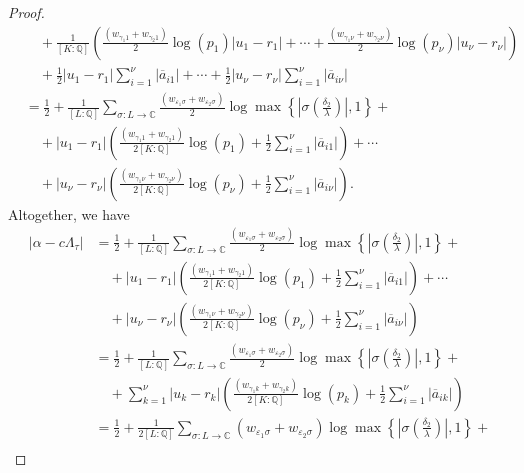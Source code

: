 \begin{proof}
\begin{align*}
	&\quad + \frac{1}{[K:\mathbb{Q}]}\left(\frac{(w_{\gamma_1 1} + w_{\gamma_2 1})}{2}\log(p_1)|u_1 - r_1|+ \cdots + \frac{(w_{\gamma_1 \nu} + w_{\gamma_2 \nu})}{2}\log(p_{\nu})|u_{\nu} - r_{\nu}|\right) \\
	& \quad + \frac{1}{2}|u_1-r_1|\sum_{i=1}^{\nu}|\overline{a}_{i1}| + \cdots + \frac{1}{2}|u_{\nu} - r_{\nu}| \sum_{i=1}^{\nu}|\overline{a}_{i\nu}|\\
	& = \frac{1}{2} + \frac{1}{[L:\mathbb{Q}]}\sum_{\sigma :L \to \mathbb{C}} \frac{(w_{\varepsilon_1 \sigma} + w_{\varepsilon_2 \sigma})}{2}\log \max \left\{ \left|\sigma\left(\frac{\delta_2}{\lambda}\right)\right|, 1\right\} + \\
	& \quad + |u_1 - r_1|\left( \frac{(w_{\gamma_1 1} + w_{\gamma_2 1})}{2[K:\mathbb{Q}]}\log(p_1) + \frac{1}{2}\sum_{i=1}^{\nu}|\overline{a}_{i1}|\right) + \cdots \\
	& \quad + |u_{\nu} - r_{\nu}|\left( \frac{(w_{\gamma_1 {\nu}} + w_{\gamma_2 {\nu}})}{2[K:\mathbb{Q}]}\log(p_{\nu}) + \frac{1}{2}\sum_{i=1}^{\nu}|\overline{a}_{i{\nu}}|\right). 
\end{align*}
Altogether, we have
\begin{align*}
|\alpha-c\Lambda_\tau| 
	& = \frac{1}{2} + \frac{1}{[L:\mathbb{Q}]}\sum_{\sigma :L \to \mathbb{C}} \frac{(w_{\varepsilon_1 \sigma} + w_{\varepsilon_2 \sigma})}{2}\log \max \left\{ \left|\sigma\left(\frac{\delta_2}{\lambda}\right)\right|, 1\right\} + \\
	& \quad + |u_1 - r_1|\left( \frac{(w_{\gamma_1 1} + w_{\gamma_2 1})}{2[K:\mathbb{Q}]}\log(p_1) + \frac{1}{2}\sum_{i=1}^{\nu}|\overline{a}_{i1}|\right) + \cdots \\
	& \quad + |u_{\nu} - r_{\nu}|\left( \frac{(w_{\gamma_1 {\nu}} + w_{\gamma_2 {\nu}})}{2[K:\mathbb{Q}]}\log(p_{\nu}) + \frac{1}{2}\sum_{i=1}^{\nu}|\overline{a}_{i{\nu}}|\right)\\
	& = \frac{1}{2} + \frac{1}{[L:\mathbb{Q}]}\sum_{\sigma :L \to \mathbb{C}} \frac{(w_{\varepsilon_1 \sigma} + w_{\varepsilon_2 \sigma})}{2}\log \max \left\{ \left|\sigma\left(\frac{\delta_2}{\lambda}\right)\right|, 1\right\} + \\
	& \quad + \sum_{k = 1}^{\nu} |u_k - r_k|\left( \frac{(w_{\gamma_1 k} + w_{\gamma_2 k})}{2[K:\mathbb{Q}]}\log(p_k) + \frac{1}{2}\sum_{i=1}^{\nu}|\overline{a}_{ik}|\right)\\
	& = \frac{1}{2} + \frac{1}{2[L:\mathbb{Q}]}\sum_{\sigma :L \to \mathbb{C}} (w_{\varepsilon_1 \sigma} + w_{\varepsilon_2 \sigma})\log \max \left\{ \left|\sigma\left(\frac{\delta_2}{\lambda}\right)\right|, 1\right\} + \\

\end{align*}
\end{proof}
